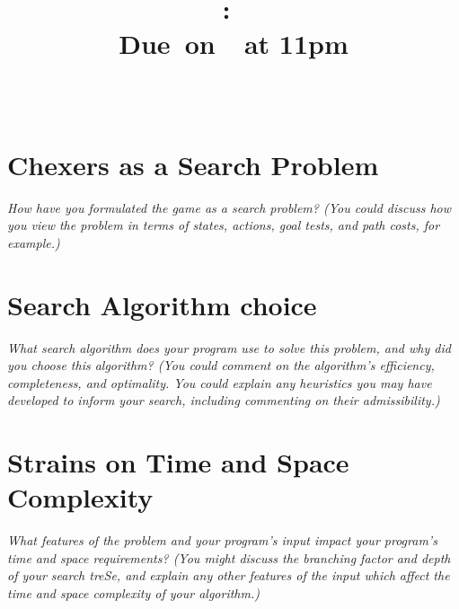 \documentclass{article}[11pt]
\title{
    \vspace{2in}
    \textmd{\textbf{\hmwkClass:\ \hmwkTitle}}\\
    \normalsize\vspace{0.1in}\small{Due\ on\ \hmwkDueDate\ at 11pm}\\
    \vspace{0.1in}\large{\textit{\hmwkClassInstructor\ \hmwkClassTime}}
    \vspace{3in}
}
\author{\hmwkAuthorName}
\date{}
\theoremstyle{plain}
\theoremstyle{definition}
\begin{document}
\maketitle

\pagebreak

\section{Chexers as a Search Problem}

\textit{How have you formulated the game as a search problem? (You could discuss how you view the problem in terms of states, actions, goal tests, and path costs, for example.)}

\section{Search Algorithm choice}

\textit{What search algorithm does your program use to solve this problem, and why did you choose this algorithm? (You could comment on the algorithm’s efficiency, completeness, and optimality. You could explain any heuristics you may have developed to inform your search, including commenting on their admissibility.)}

\section{Strains on Time and Space Complexity}

\textit{What features of the problem and your program’s input impact your program’s time and space requirements? (You might discuss the branching factor and depth of your search treSe, and explain any other features of the input which affect the time and space complexity of your algorithm.)}
\end{document}
